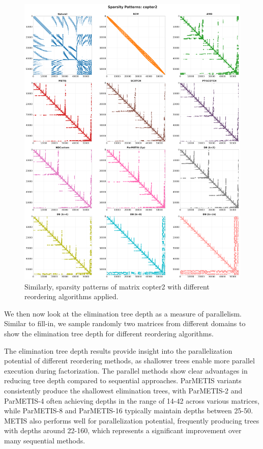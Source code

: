 \begin{figure}[h]
\centering
\includegraphics[width=\textwidth]{fig/res/copter2_sparsity_patterns.png}
\caption{Similarly, sparsity patterns of matrix copter2 with different reordering algorithms applied.}
\label{fig:copter2-sparsity-patterns}
\end{figure}

We then now look at the elimination tree depth as a measure of parallelism. Similar to fill-in, we sample randomly two matrices from different domains to show the elimination tree depth for different reordering algorithms.

The elimination tree depth results provide insight into the parallelization potential of different reordering methods, as shallower trees enable more parallel execution during factorization. The parallel methods show clear advantages in reducing tree depth compared to sequential approaches. ParMETIS variants consistently produce the shallowest elimination trees, with ParMETIS-2 and ParMETIS-4 often achieving depths in the range of 14-42 across various matrices, while ParMETIS-8 and ParMETIS-16 typically maintain depths between 25-50. METIS also performs well for parallelization potential, frequently producing trees with depths around 22-160, which represents a significant improvement over many sequential methods.

